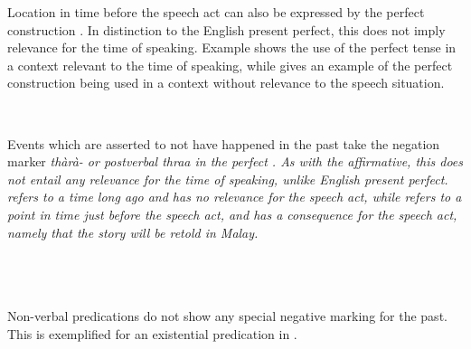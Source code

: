 Location in time before the speech act can also be expressed by  the  perfect construction . In distinction to the English present perfect, this does not imply relevance for the time of speaking. Example  shows the use of the perfect tense in a context relevant to the time of speaking, while   gives an example of the perfect construction being used in a context without relevance to the speech situation.


 \\


Events  which are asserted to not have happened in the past take the negation marker \em thàrà- \em {} or postverbal \em thraa \em in the perfect . As with the affirmative, this does not entail any relevance for the time of speaking, unlike English present perfect.  refers to a time long ago and has no relevance for the speech act, while  refers to a point in time just before the speech act, and has a consequence for the speech act, namely that the story will be retold in Malay.

 \\

\\

  \\
Non-verbal predications do not show any special negative marking for the past. This is exemplified for an existential predication in .


